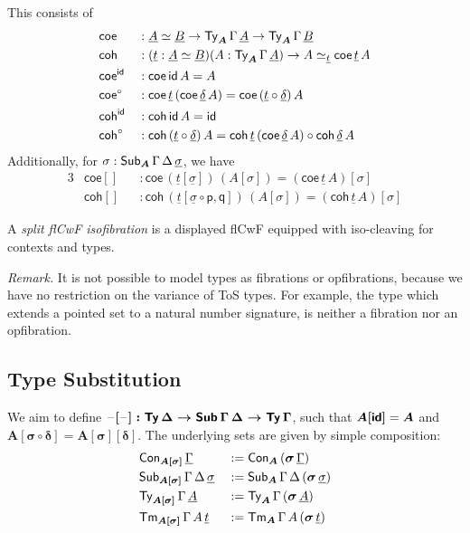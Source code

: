 \documentclass[sigplan,review,anonymous]{acmart}\settopmatter{printfolios=true,printccs=false,printacmref=false}
\newcommand{\p}{\mathsf{p}}
\newcommand{\q}{\mathsf{q}}
\newcommand{\bsigma}{\boldsymbol{\sigma}}
\newcommand{\bA}{\boldsymbol{A}}
\newcommand{\ul}[1]{\underline{#1}}
\newcommand{\ulGamma}{\ul{\Gamma}}
\newcommand{\uldelta}{\ul{\delta}}
\newcommand{\ulsigma}{\ul{\sigma}}
\newcommand{\ult}{\ul{t}}
\newcommand{\ulA}{\ul{A}}
\newcommand{\ulB}{\ul{B}}
\newcommand{\coe}{\mathsf{coe}}
\newcommand{\coh}{\mathsf{coh}}
\begin{document}
\begin{definition} This consists of
\begin{alignat*}{3}
  & \coe &&: \ulA \simeq \ulB \ra \Ty_{\bA}\,\Gamma\,\ulA \ra \Ty_{\bA}\,\Gamma\,\ulB\\
  & \coh &&: (\ult : \ulA \simeq \ulB)(A : \Ty_{\bA}\,\Gamma\,\ulA)
           \ra A \simeq_{\ult} \coe\,\ult\,A\\
  & \coe^{\id} && : \coe\,\id\,A = A\\
  & \coe^{\circ} && : \coe\,\ult\,(\coe\,\uldelta\,A) = \coe\,(\ult\circ\uldelta)\,A\\
  & \coh^{\id} &&: \coh\,\id\,A = \id\\
  & \coh^{\circ} &&: \coh\,(\ult\circ\uldelta)\,A = \coh\,\ult\,(\coe\,\uldelta\,A)
          \circ \coh\,\uldelta\,A
\end{alignat*}
Additionally, for $\sigma : \Sub_{\bA}\,\Gamma\,\Delta\,\ulsigma$, we have
\begin{alignat*}{3}
  & \coe[] &&: \coe\,(\ult[\ulsigma])\,(A[\sigma]) = (\coe\,\ult\,A)[\sigma]\\
  & \coh[] &&: \coh\,(\ult[\ulsigma\circ \p,\q])\,(A[\sigma]) = (\coh\,\ult\,A)[\sigma]
\end{alignat*}

\end{definition}

\begin{definition} A \emph{split flCwF isofibration} is a displayed flCwF equipped with iso-cleaving for contexts and types.
\end{definition}

\emph{Remark.} It is not possible to model types as fibrations or opfibrations,
because we have no restriction on the variance of ToS types. For example, the
type which extends a pointed set to a natural number signature, is neither a
fibration nor an opfibration.

\subsection{Type Substitution}
We aim to define $\boldsymbol{\mathord{\hspace{1pt}\text{--}\hspace{1pt}}[\mathord{\hspace{1pt}\text{--}\hspace{1pt}}] : \mathsf{Ty}\,\Delta \rightarrow
  \mathsf{Sub}\,\Gamma\,\Delta \rightarrow \mathsf{Ty}\,\Gamma}$, such that $\boldsymbol{A[\id]} = \bA$
and $\boldsymbol{A[\sigma\circ\delta]} = \boldsymbol{A[\sigma][\delta]}$. The
underlying sets are given by simple composition:
\begin{alignat*}{3}
  & \Con_{\boldsymbol{A[\sigma]}}\,\ulGamma && := \Con_{\bA}\,(\bsigma\,\ulGamma)\\
  & \Sub_{\boldsymbol{A[\sigma]}}\,\Gamma\,\Delta\,\ulsigma && :=
    \Sub_{\bA}\,\Gamma\,\Delta\,(\bsigma\,\ulsigma)\\
  & \Ty_{\boldsymbol{A[\sigma]}}\,\Gamma\,\ulA && :=
      \Ty_{\bA}\,\Gamma\,(\bsigma\,\ulA)\\
  & \Tm_{\boldsymbol{A[\sigma]}}\,\Gamma\,A\,\ult && :=
      \Tm_{\bA}\,\Gamma\,A\,(\bsigma\,\ult)
\end{alignat*}
\end{document}
